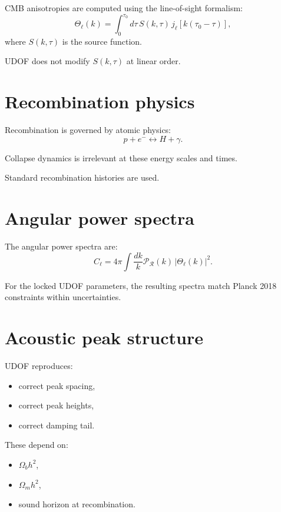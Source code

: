 \documentclass[11pt]{book}
\begin{document}
CMB anisotropies are computed using the line-of-sight formalism:
\begin{equation}
\Theta_\ell(k) = \int_0^{\tau_0} d\tau\,
S(k,\tau)\,j_\ell[k(\tau_0 - \tau)],
\end{equation}
where $S(k,\tau)$ is the source function.

UDOF does not modify $S(k,\tau)$ at linear order.

\section{Recombination physics}

Recombination is governed by atomic physics:
\begin{equation}
p + e^- \leftrightarrow H + \gamma.
\end{equation}

Collapse dynamics is irrelevant at these energy scales and times.

Standard recombination histories are used.

\section{Angular power spectra}

The angular power spectra are:
\begin{equation}
C_\ell = 4\pi \int \frac{dk}{k}
\mathcal{P}_\mathcal{R}(k)\,|\Theta_\ell(k)|^2.
\end{equation}

For the locked UDOF parameters, the resulting spectra match Planck 2018
constraints within uncertainties.

\section{Acoustic peak structure}

UDOF reproduces:
\begin{itemize}
\item correct peak spacing,
\item correct peak heights,
\item correct damping tail.
\end{itemize}

These depend on:
\begin{itemize}
\item $\Omega_b h^2$,
\item $\Omega_m h^2$,
\item sound horizon at recombination.
\end{itemize}
\end{document}
